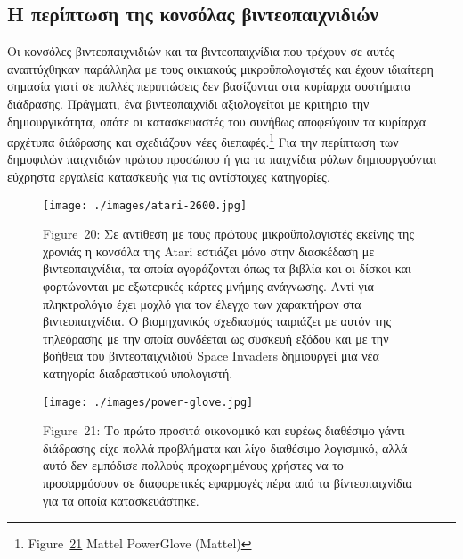 \documentclass[
]{article}
\begin{document}
\hypertarget{ux3b7-ux3c0ux3b5ux3c1ux3afux3c0ux3c4ux3c9ux3c3ux3b7-ux3c4ux3b7ux3c2-ux3baux3bfux3bdux3c3ux3ccux3bbux3b1ux3c2-ux3b2ux3b9ux3bdux3c4ux3b5ux3bfux3c0ux3b1ux3b9ux3c7ux3bdux3b9ux3b4ux3b9ux3ceux3bd}{%
\subsection{Η περίπτωση της κονσόλας
βιντεοπαιχνιδιών}\label{ux3b7-ux3c0ux3b5ux3c1ux3afux3c0ux3c4ux3c9ux3c3ux3b7-ux3c4ux3b7ux3c2-ux3baux3bfux3bdux3c3ux3ccux3bbux3b1ux3c2-ux3b2ux3b9ux3bdux3c4ux3b5ux3bfux3c0ux3b1ux3b9ux3c7ux3bdux3b9ux3b4ux3b9ux3ceux3bd}}

Οι κονσόλες βιντεοπαιχνιδιών και τα βιντεοπαιχνίδια που τρέχουν σε αυτές
αναπτύχθηκαν παράλληλα με τους οικιακούς μικροϋπολογιστές και έχουν
ιδιαίτερη σημασία γιατί σε πολλές περιπτώσεις δεν βασίζονται στα
κυρίαρχα συστήματα διάδρασης. Πράγματι, ένα βιντεοπαιχνίδι αξιολογείται
με κριτήριο την δημιουργικότητα, οπότε οι κατασκευαστές του συνήθως
αποφεύγουν τα κυρίαρχα αρχέτυπα διάδρασης και σχεδιάζουν νέες
διεπαφές.\footnote{Figure~\protect\hyperlink{fig:power-glove}{21} Mattel
  PowerGlove (Mattel)} Για την περίπτωση των δημοφιλών παιχνιδιών πρώτου
προσώπου ή για τα παιχνίδια ρόλων δημιουργούνται εύχρηστα εργαλεία
κατασκευής για τις αντίστοιχες κατηγορίες.

\leavevmode{}%
\begin{figure}
\hypertarget{fig:atari-2600}{%
\centering
\texttt{[image: ./images/atari-2600.jpg]}
\caption{Figure~20: Σε αντίθεση με τους πρώτους μικροϋπολογιστές εκείνης
της χρονιάς η κονσόλα της Atari εστιάζει μόνο στην διασκέδαση με
βιντεοπαιχνίδια, τα οποία αγοράζονται όπως τα βιβλία και οι δίσκοι και
φορτώνονται με εξωτερικές κάρτες μνήμης ανάγνωσης. Αντί για πληκτρολόγιο
έχει μοχλό για τον έλεγχο των χαρακτήρων στα βιντεοπαιχνίδια. Ο
βιομηχανικός σχεδιασμός ταιριάζει με αυτόν της τηλεόρασης με την οποία
συνδέεται ως συσκευή εξόδου και με την βοήθεια του βιντεοπαιχνιδιού
Space Invaders δημιουργεί μια νέα κατηγορία διαδραστικού
υπολογιστή.}\label{fig:atari-2600}
}
\end{figure}

\leavevmode{}%
\begin{figure}
\hypertarget{fig:power-glove}{%
\centering
\texttt{[image: ./images/power-glove.jpg]}
\caption{Figure~21: Το πρώτο προσιτά οικονομικό και ευρέως διαθέσιμο
γάντι διάδρασης είχε πολλά προβλήματα και λίγο διαθέσιμο λογισμικό, αλλά
αυτό δεν εμπόδισε πολλούς προχωρημένους χρήστες να το προσαρμόσουν σε
διαφορετικές εφαρμογές πέρα από τα βίντεοπαιχνίδια για τα οποία
κατασκευάστηκε.}\label{fig:power-glove}
}
\end{figure}
\end{document}

